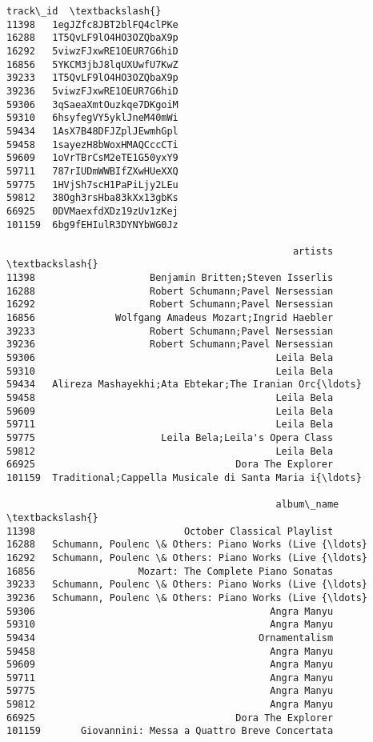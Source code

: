 \documentclass[11pt]{article}
\makeatletter
\newcommand{\boxspacing}{\kern\kvtcb@left@rule\kern\kvtcb@boxsep}
\newcommand{\prompt}[4]{
        {\ttfamily\llap{{\color{#2}[#3]:\hspace{3pt}#4}}\vspace{-\baselineskip}}
    }
\makeatother
\begin{document}
            \begin{tcolorbox}[breakable, size=fbox, boxrule=.5pt, pad at break*=1mm, opacityfill=0]
\prompt{Out}{outcolor}{59}{\boxspacing}
\begin{Verbatim}[commandchars=\\\{\}]
                      track\_id  \textbackslash{}
11398   1egJZfc8JBT2blFQ4clPKe
16288   1T5QvLF9lO4HO3OZQbaX9p
16292   5viwzFJxwRE1OEUR7G6hiD
16856   5YKCM3jbJ8lqUXUwfU7KwZ
39233   1T5QvLF9lO4HO3OZQbaX9p
39236   5viwzFJxwRE1OEUR7G6hiD
59306   3qSaeaXmtOuzkqe7DKgoiM
59310   6hsyfegVY5yklJneM40mWi
59434   1AsX7B48DFJZplJEwmhGpl
59458   1sayezH8bWoxHMAQCccCTi
59609   1oVrTBrCsM2eTE1G50yxY9
59711   787rIUDmWWBIfZXwHUeXXQ
59775   1HVjSh7scH1PaPiLjy2LEu
59812   38Ogh3rsHba83kXx13gbKs
66925   0DVMaexfdXDz19zUv1zKej
101159  6bg9fEHIulR3DYNYbWG0Jz

                                                  artists  \textbackslash{}
11398                    Benjamin Britten;Steven Isserlis
16288                    Robert Schumann;Pavel Nersessian
16292                    Robert Schumann;Pavel Nersessian
16856              Wolfgang Amadeus Mozart;Ingrid Haebler
39233                    Robert Schumann;Pavel Nersessian
39236                    Robert Schumann;Pavel Nersessian
59306                                          Leila Bela
59310                                          Leila Bela
59434   Alireza Mashayekhi;Ata Ebtekar;The Iranian Orc{\ldots}
59458                                          Leila Bela
59609                                          Leila Bela
59711                                          Leila Bela
59775                      Leila Bela;Leila's Opera Class
59812                                          Leila Bela
66925                                   Dora The Explorer
101159  Traditional;Cappella Musicale di Santa Maria i{\ldots}

                                               album\_name  \textbackslash{}
11398                          October Classical Playlist
16288   Schumann, Poulenc \& Others: Piano Works (Live {\ldots}
16292   Schumann, Poulenc \& Others: Piano Works (Live {\ldots}
16856                  Mozart: The Complete Piano Sonatas
39233   Schumann, Poulenc \& Others: Piano Works (Live {\ldots}
39236   Schumann, Poulenc \& Others: Piano Works (Live {\ldots}
59306                                         Angra Manyu
59310                                         Angra Manyu
59434                                       Ornamentalism
59458                                         Angra Manyu
59609                                         Angra Manyu
59711                                         Angra Manyu
59775                                         Angra Manyu
59812                                         Angra Manyu
66925                                   Dora The Explorer
101159       Giovannini: Messa a Quattro Breve Concertata


\end{Verbatim}
\end{tcolorbox}
\end{document}
